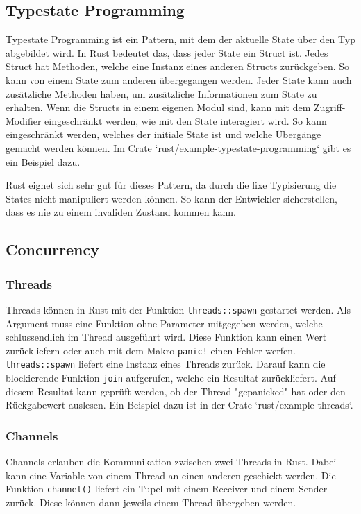 \documentclass[letterpaper,12pt]{article}
\begin{document}
    \subsection{Typestate Programming}\label{subsec:typestate-programming)}
    Typestate Programming ist ein Pattern, mit dem der aktuelle State über den Typ abgebildet wird.
    In Rust bedeutet das, dass jeder State ein Struct ist.
    Jedes Struct hat Methoden, welche eine Instanz eines anderen Structs zurückgeben.
    So kann von einem State zum anderen übergegangen werden.
    Jeder State kann auch zusätzliche Methoden haben, um zusätzliche Informationen zum State zu erhalten.
    Wenn die Structs in einem eigenen Modul sind, kann mit dem Zugriff-Modifier eingeschränkt werden, wie mit den State interagiert wird.
    So kann eingeschränkt werden, welches der initiale State ist und welche Übergänge gemacht werden können.
    Im Crate `rust/example-typestate-programming` gibt es ein Beispiel dazu.

    Rust eignet sich sehr gut für dieses Pattern, da durch die fixe Typisierung die States nicht manipuliert werden können.
    So kann der Entwickler sicherstellen, dass es nie zu einem invaliden Zustand kommen kann.

    \subsection{Concurrency}\label{subsec:concurrency}
    \subsubsection{Threads}\label{subsubsec:threads}
    Threads können in Rust mit der Funktion \texttt{threads::spawn} gestartet werden.
    Als Argument muss eine Funktion ohne Parameter mitgegeben werden, welche schlussendlich im Thread ausgeführt wird.
    Diese Funktion kann einen Wert zurückliefern oder auch mit dem Makro \texttt{panic!} einen Fehler werfen.
    \texttt{threads::spawn} liefert eine Instanz eines Threads zurück.
    Darauf kann die blockierende Funktion \texttt{join} aufgerufen, welche ein Resultat zurückliefert.
    Auf diesem Resultat kann geprüft werden, ob der Thread "gepanicked" hat oder den Rückgabewert auslesen.
    Ein Beispiel dazu ist in der Crate `rust/example-threads`.

    \subsubsection{Channels}\label{subsubsec:channels}
    Channels erlauben die Kommunikation zwischen zwei Threads in Rust.
    Dabei kann eine Variable von einem Thread an einen anderen geschickt werden.
    Die Funktion \texttt{channel()} liefert ein Tupel mit einem Receiver und einem Sender zurück.
    Diese können dann jeweils einem Thread übergeben werden.
\end{document}
